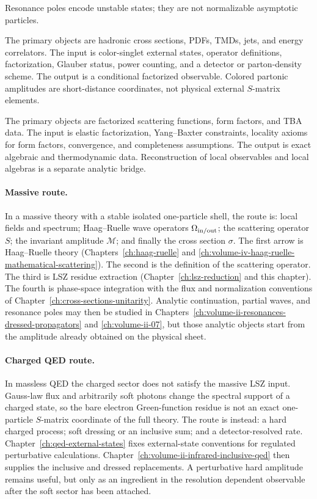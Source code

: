 \begin{description}
  Resonance poles encode unstable states; they are not normalizable
  asymptotic particles.
  \item[Confining gauge theory and QCD factorization.]
  The primary objects are hadronic cross sections, PDFs, TMDs, jets, and
  energy correlators.  The input is color-singlet external states, operator
  definitions, factorization, Glauber status, power counting, and a detector
  or parton-density scheme.  The output is a conditional factorized
  observable.  Colored partonic amplitudes are short-distance coordinates,
  not physical external \(S\)-matrix elements.
  \item[Integrable two-dimensional scattering.]
  The primary objects are factorized scattering functions, form factors, and
  TBA data.  The input is elastic factorization, Yang--Baxter constraints,
  locality axioms for form factors, convergence, and completeness assumptions.
  The output is exact algebraic and thermodynamic data.  Reconstruction of
  local observables and local algebras is a separate analytic bridge.
\end{description}

\paragraph{Massive route.}
In a massive theory with a stable isolated one-particle shell, the route is:
local fields and spectrum; Haag--Ruelle wave operators
\(\Omega_{\rm in/out}\); the scattering operator \(S\); the invariant
amplitude \(\mathcal M\); and finally the cross section \(\sigma\).
The first arrow is Haag--Ruelle theory
(Chapters~\ref{ch:haag-ruelle} and
\ref{ch:volume-iv-haag-ruelle-mathematical-scattering}).  The second is the
definition of the scattering operator.  The third is LSZ residue extraction
(Chapter~\ref{ch:lsz-reduction} and this chapter).  The fourth is phase-space
integration with the flux and normalization conventions of
Chapter~\ref{ch:cross-sections-unitarity}.  Analytic continuation, partial
waves, and resonance poles may then be studied in
Chapters~\ref{ch:volume-ii-resonances-dressed-propagators} and
\ref{ch:volume-ii-07}, but those analytic objects start from the amplitude
already obtained on the physical sheet.

\paragraph{Charged QED route.}
In massless QED the charged sector does not satisfy the massive LSZ input.
Gauss-law flux and arbitrarily soft photons change the spectral support of a
charged state, so the bare electron Green-function residue is not an exact
one-particle \(S\)-matrix coordinate of the full theory.  The route is
instead: a hard charged process; soft dressing or an inclusive sum; and a
detector-resolved rate.
Chapter~\ref{ch:qed-external-states} fixes external-state conventions for
regulated perturbative calculations.  Chapter~\ref{ch:volume-ii-infrared-inclusive-qed}
then supplies the inclusive and dressed replacements.  A perturbative hard
amplitude remains useful, but only as an ingredient in the resolution
dependent observable after the soft sector has been attached.


